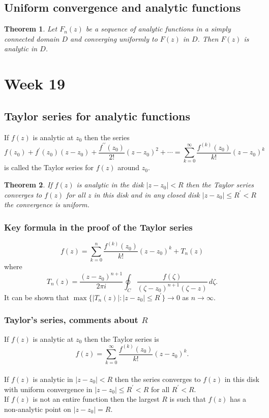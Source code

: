 \documentclass{article}
\newtheorem{theorem}{Theorem}
\begin{document}
\subsection{Uniform convergence and analytic functions}
\begin{theorem}
    Let $F_n(z)$ be a sequence of analytic functions in a simply connected domain $D$ and converging uniformly to $F(z)$ in $D$. Then $F(z)$ is analytic in $D$.
\end{theorem}


\section{Week 19}
\subsection{Taylor series for analytic functions}
If $f(z)$ is analytic at $z_0$ then the series
\begin{equation}
    f(z_0) + f^\prime(z_0)(z-z_0) + \frac{f^{\prime\prime}(z_0)}{2!}(z-z_0)^2 + \cdots = \sum_{k=0}^\infty \frac{f^{(k)}(z_0)}{k!}(z-z_0)^k
\end{equation}
is called the Taylor series for $f(z)$ around $z_0$.
\begin{theorem}
    If $f(z)$ is analytic in the disk $\vert z-z_0\vert<R$ then the Taylor series converges to $f(z)$ for all $z$ in this disk and in any closed disk $\vert z-z_0\vert\leq R^\prime<R$ the convergence is uniform.
\end{theorem}
\subsubsection{Key formula in the proof of the Taylor series}
\begin{equation}
    f(z) = \sum_{k=0}^n \frac{f^{(k)}(z_0)}{k!}(z-z_0)^k + T_n(z)
\end{equation}
where
\begin{equation}
    T_n(z) = \frac{(z-z_0)^{n+1}}{2\pi i}\oint_C \frac{f(\zeta)}{(\zeta-z_0)^{n+1}(\zeta - z)}\,d\zeta.
\end{equation}
It can be shown that $\max\{ \vert T_n(z)\vert: \vert z-z_0\vert \leq R^\prime \}\to 0$ as $n\to\infty$.

\subsubsection{Taylor's series, comments about $R$}
If $f(z)$ is analytic at $z_0$ then the Taylor series is
\begin{equation}
    f(z) = \sum_{k=0}^\infty \frac{f^{(k)}(z_0)}{k!}(z-z_0)^k.
\end{equation}\\
If $f(z)$ is analytic in $\vert z-z_0\vert<R$ then the series converges to $f(z)$ in this disk with uniform convergence in $\vert z-z_0\vert \leq R^\prime < R$ for all $R^\prime<R$.\\
If $f(z)$ is not an entire function then the largest $R$ is such that $f(z)$ has a non-analytic point on $\vert z-z_0\vert = R$.
\end{document}

